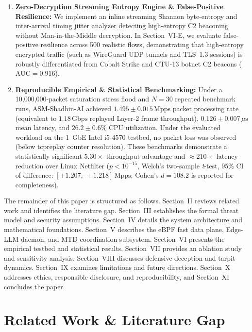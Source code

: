 \documentclass{ieeeaccess}
\renewcommand{\_}{\textunderscore\allowbreak}
\begin{document}
\begin{enumerate}
  \item \textbf{Zero-Decryption Streaming Entropy Engine \& False-Positive Resilience:} We implement an inline
    streaming Shannon byte-entropy and inter-arrival timing jitter analyzer
    detecting high-entropy C2 beaconing without Man-in-the-Middle decryption.
    In Section~VI-E, we evaluate false-positive resilience across 500 realistic flows,
    demonstrating that high-entropy encrypted traffic (such as WireGuard UDP tunnels and TLS~1.3 sessions)
    is robustly differentiated from Cobalt Strike and CTU-13 botnet C2 beacons ($\text{AUC}=0.916$).

  \item \textbf{Reproducible Empirical \& Statistical Benchmarking:} Under a
    10,000,000-packet saturation stress flood and $N=30$ repeated benchmark runs,
    ASM-Shadhin-AI achieved $1.495 \pm 0.015\,\text{Mpps}$ packet processing rate
    (equivalent to $1.18\,\text{Gbps}$ replayed Layer-2 frame throughput),
    $0.126 \pm 0.007\,\mu\text{s}$ mean latency, and $26.2 \pm 0.6\%$ CPU utilization.
    Under the evaluated workload on the 1~GbE Intel i5-4570 testbed, no packet loss was
    observed (below tcpreplay counter resolution). These benchmarks demonstrate a
    statistically significant $5.30\times$ throughput advantage and $\approx\!210\times$
    latency reduction over Linux Netfilter ($p < 10^{-15}$, Welch's two-sample
    \textit{t}-test, 95\% CI of difference: $[+1.207,\, +1.218]\,\text{Mpps}$; Cohen's
    $d = 108.2$ is reported for completeness).
\end{enumerate}

The remainder of this paper is structured as follows.
Section~II reviews related work and identifies the literature gap.
Section~III establishes the formal threat model and security assumptions.
Section~IV details the system architecture and mathematical foundations.
Section~V describes the eBPF fast data plane, Edge-LLM daemon, and MTD
coordination subsystem. Section~VI presents the empirical testbed and statistical
results. Section~VII provides an ablation study and sensitivity analysis.
Section~VIII discusses defensive deception and tarpit dynamics. Section~IX
examines limitations and future directions. Section~X addresses ethics,
responsible disclosure, and reproducibility, and Section~XI concludes the paper.

\section{Related Work \& Literature Gap}
\end{document}
